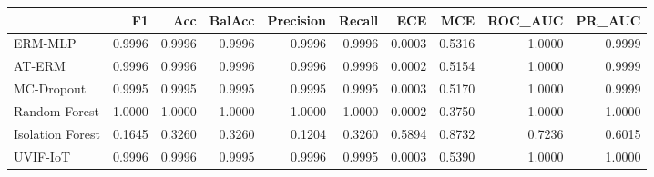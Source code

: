 \begin{tabular}{lrrrrrrrrr}
\toprule
 & F1 & Acc & BalAcc & Precision & Recall & ECE & MCE & ROC_AUC & PR_AUC \\
\midrule
ERM-MLP & 0.9996 & 0.9996 & 0.9996 & 0.9996 & 0.9996 & 0.0003 & 0.5316 & 1.0000 & 0.9999 \\
AT-ERM & 0.9996 & 0.9996 & 0.9996 & 0.9996 & 0.9996 & 0.0002 & 0.5154 & 1.0000 & 0.9999 \\
MC-Dropout & 0.9995 & 0.9995 & 0.9995 & 0.9995 & 0.9995 & 0.0003 & 0.5170 & 1.0000 & 0.9999 \\
Random Forest & 1.0000 & 1.0000 & 1.0000 & 1.0000 & 1.0000 & 0.0002 & 0.3750 & 1.0000 & 1.0000 \\
Isolation Forest & 0.1645 & 0.3260 & 0.3260 & 0.1204 & 0.3260 & 0.5894 & 0.8732 & 0.7236 & 0.6015 \\
UVIF-IoT & 0.9996 & 0.9996 & 0.9995 & 0.9996 & 0.9995 & 0.0003 & 0.5390 & 1.0000 & 1.0000 \\
\bottomrule
\end{tabular}
